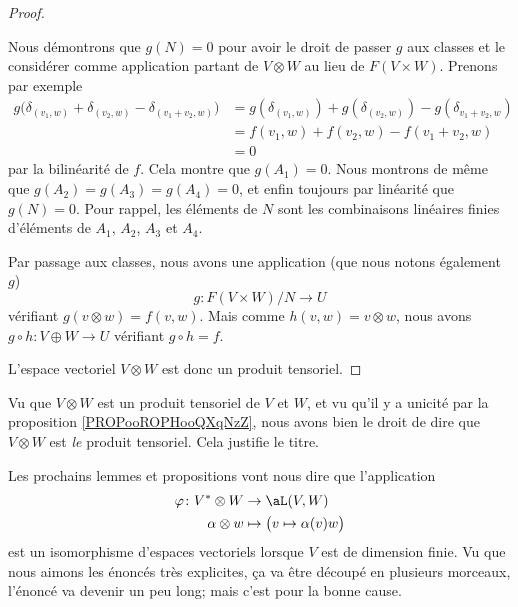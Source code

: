 \begin{proof}
\begin{subproof}
		Nous démontrons que \( g(N)=0\) pour avoir le droit de passer \( g\) aux classes et le considérer comme application partant de \( V\otimes W\) au lieu de \( F(V\times W)\). Prenons par exemple
		\begin{subequations}
			\begin{align}
				g\big( \delta_{(v_1,w)}+\delta_{(v_2,w)}-\delta_{(v_1+v_2,w)} \big) & =g( \delta_{(v_1,w)} )+g(\delta_{(v_2,w)})-g(\delta_{v_1+v_2,w}) \\
				                                                                    & =f(v_1,w)+f(v_2,w)-f(v_1+v_2,w)                                  \\
				                                                                    & =0
			\end{align}
		\end{subequations}
		par la bilinéarité de \( f\). Cela montre que \( g(A_1)=0\). Nous montrons de même que \( g(A_2)=g(A_3)=g(A_4)=0\), et enfin toujours par linéarité que \( g(N)=0\). Pour rappel, les éléments de \( N\) sont les combinaisons linéaires finies d'éléments de \( A_1\), \( A_2\), \( A_3\) et \( A_4\).

		Par passage aux classes, nous avons une application (que nous notons également \( g\))
		\begin{equation}
			g\colon F(V\times W)/N\to U
		\end{equation}
		vérifiant \( g(v\otimes w)=f(v,w)\). Mais comme \( h(v,w)=v\otimes w\), nous avons \( g\circ h\colon V\oplus W\to U\) vérifiant \( g\circ h=f\).
	\end{subproof}
	L'espace vectoriel \( V\otimes W\) est donc un produit tensoriel.
\end{proof}

\begin{normaltext}
	Vu que \( V\otimes W\) est un produit tensoriel de \( V\) et \( W\), et vu qu'il y a unicité par la proposition \ref{PROPooROPHooQXqNzZ}, nous avons bien le droit de dire que \( V\otimes W\) est \emph{le} produit tensoriel. Cela justifie le titre.
\end{normaltext}

\begin{normaltext}
	Les prochains lemmes et propositions vont nous dire que l'application
	\begin{equation}
		\begin{aligned}
			\varphi\colon V^*\otimes W & \to \aL(V,W)                            \\
			\alpha\otimes w            & \mapsto \big( v\mapsto \alpha(v)w \big)
		\end{aligned}
	\end{equation}
	est un isomorphisme d'espaces vectoriels lorsque \( V\) est de dimension finie. Vu que nous aimons les énoncés très explicites, ça va être découpé en plusieurs morceaux, l'énoncé va devenir un peu long; mais c'est pour la bonne cause.
\end{normaltext}

